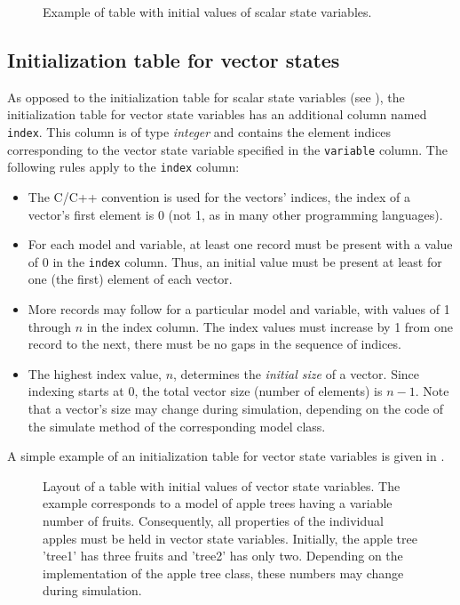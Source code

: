 \begin{figure*}[htbp]
  
  \caption{Example of table with initial values of scalar state variables. \label{fig:input-initScal}}
\end{figure*}

\subsection{Initialization table for vector states} \label{sec:input-initVect}

As opposed to the initialization table for scalar state variables (see ), the initialization table for vector state variables has an additional column named \verb!index!. This column is of type \textit{integer} and contains the element indices corresponding to the vector state variable specified in the \verb!variable! column. The following rules apply to the \verb!index! column:
\begin{itemize}
  \item The C/C++ convention is used for the vectors' indices, \ie{} the index of a vector's first element is 0 (not 1, as in many other programming languages).
  \item For each model and variable, at least one record must be present with a value of 0 in the \verb!index! column. Thus, an initial value must be present at least for one (the first) element of each vector.
  \item More records may follow for a particular model and variable, with values of 1 through $n$ in the index column. The index values must increase by 1 from one record to the next, \ie{} there must be no gaps in the sequence of indices.
  \item The highest index value, $n$, determines the \emph{initial size} of a vector. Since indexing starts at 0, the total vector size (number of elements) is $n-1$. Note that a vector's size may change during simulation, depending on the code of the simulate method of the corresponding model class.
\end{itemize}

A simple example of an initialization table for vector state variables is given in .

\begin{figure*}[htbp]
  
  \caption[Layout of a table with initial values of vector state variables.]{Layout of a table with initial values of vector state variables. The example corresponds to a model of apple trees having a variable number of fruits. Consequently, all properties of the individual apples must be held in vector state variables. Initially, the apple tree 'tree1' has three fruits and 'tree2' has only two. Depending on the implementation of the apple tree class, these numbers may change during simulation.
 \label{fig:input-initVect}}
\end{figure*}

